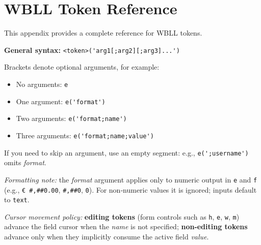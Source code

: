 \chapter{WBLL Token Reference}
\label{app:wbll-tokens}

This appendix provides a complete reference for WBLL tokens.



\newcommand{\wballsyn}[1]{\lstinline[language=WBLL,basicstyle=\ttfamily\small]!#1!}

\noindent\textbf{General syntax:} \wballsyn{<token>('arg1[;arg2][;arg3]...')}

\noindent Brackets denote optional arguments, for example:
\begin{itemize}
  \item No arguments: \wballsyn{e}
  \item One argument: \wballsyn{e('format')}
  \item Two arguments: \wballsyn{e('format;name')}
  \item Three arguments: \wballsyn{e('format;name;value')}
\end{itemize}
If you need to skip an argument, use an empty segment: e.g., \wballsyn{e(';username')} omits \textit{format}.

\par\smallskip
\textit{Formatting note:} the \textit{format} argument applies only to numeric output in \texttt{e} and \texttt{f} (e.g., \texttt{€ \#,\#\#0.00}, \texttt{\#,\#\#0}, \texttt{0}). For non‑numeric values it is ignored; inputs default to \texttt{text}.
\par\smallskip
\textit{Cursor movement policy:} \textbf{editing tokens} (form controls such as \texttt{h}, \texttt{e}, \texttt{w}, \texttt{m}) advance the field cursor when the \emph{name} is not specified; \textbf{non-editing tokens} advance only when they implicitly consume the active field \emph{value}.

